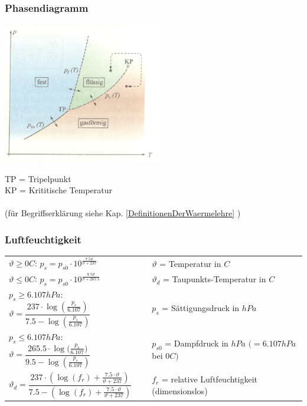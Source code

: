 		\subsubsection{Phasendiagramm}
		\begin{minipage}[t]{7cm}
			\vspace{-\ht\strutbox}\includegraphics[width=7cm]{./bilder/Phasendiagramm.png}
		\end{minipage}
		\begin{minipage}[t][7cm][t]{10cm}
			\vspace{2.3cm}
			TP = Tripelpunkt\\
			KP = Krititische Temperatur\\ \\
			(für Begriffserklärung siehe Kap. \ref{DefinitionenDerWaermelehre} )
		\end{minipage}
		\newline
		\subsubsection{Luftfeuchtigkeit}
			\begin{minipage}[t]{13cm}
					\renewcommand{\arraystretch}{3}
					\begin{tabular}{ p{6.5cm} | p{9cm}}
						$\vartheta \geq 0 $\textdegree$ C$: \quad $p_s = p_{s0} \cdot 10^{\frac{7.5 \vartheta}{\vartheta +237}}$	&	$\vartheta$ = Temperatur in \textdegree $C$\\
						$\vartheta \leq 0 $\textdegree$ C$: \quad $p_s = p_{s0} \cdot 10^{\frac{9.5 \vartheta}{\vartheta +265.5}}$	&	$\vartheta_d$ = Taupunkts-Temperatur in \textdegree $C$\\
						$p_s \geq 6.107hPa$: \quad $\vartheta = \dfrac{237 \cdot \log{(\frac{p_s}{6.107})}}{7.5 - \log{(\frac{p_s}{6.107})}}$	&	$p_s$ = Sättigungsdruck in $hPa$\\
						$p_s \leq 6.107hPa$: \quad $\vartheta = \dfrac{265.5 \cdot \log{(\frac{p_s}{6.107}})}{9.5 - \log{(\frac{p_s}{6.107})}}$	&	$p_{s0}$ = Dampfdruck in $hPa$ $(= 6.107hPa$ bei $0 $\textdegree$ C)$\\
						$\vartheta_d = \dfrac{237 \cdot (\log{(f_r)} + \frac{7.5 \cdot \vartheta}{\vartheta +237})}{7.5 - (\log{(f_r)} + \frac{7.5 \cdot \vartheta}{\vartheta +237})}$	& $f_r$ = relative Luftfeuchtigkeit (dimensionslos)\\
					\end{tabular}
					\renewcommand{\arraystretch}{1}
			\end{minipage}

